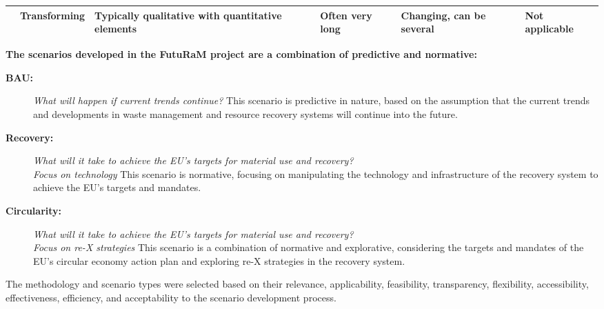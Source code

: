 \begin{landscape}
\begin{table}[h]
\begin{tabular}{|L{4.5cm}|L{1.9cm}|L{4.5cm}|L{4.0cm}|L{2.2cm}|L{4.0cm}|}
                                                                                        & Transforming                              & Typically qualitative with quantitative elements & Often very long                       & Changing, can be several                     & Not applicable                               \\
      \hline
    \end{tabular}
  \end{table}
\end{landscape}



\textbf{The scenarios developed in the FutuRaM project are a combination of predictive and normative:}
\begin{description}
  \item[\iconBAU \textbf{BAU:}]
        \textit{What will happen if current trends continue?} 
        \vspace{0.5\baselineskip}
        This scenario is predictive in nature, based on the assumption that the current trends and developments in waste management and resource recovery systems will continue into the future.
  \item[\iconREC \textbf{Recovery:}]
        \textit{What will it take to achieve the EU's targets for material use and recovery? \\ Focus on technology} 
        \vspace{0.5\baselineskip}
        This scenario is normative, focusing on manipulating the technology and infrastructure of the recovery system to achieve the EU's targets and mandates.
  \item[\iconCIR \textbf{Circularity:}]
        \textit{What will it take to achieve the EU's targets for material use and recovery? \\ Focus on re-X strategies} 
        \vspace{0.5\baselineskip}
        This scenario is a combination of normative and explorative, considering the targets and mandates of the EU's circular economy action plan and exploring re-X strategies in the recovery system.
\end{description}

The methodology and scenario types were selected based on their relevance, applicability, feasibility, transparency, flexibility, accessibility, effectiveness, efficiency, and acceptability to the scenario development process.



